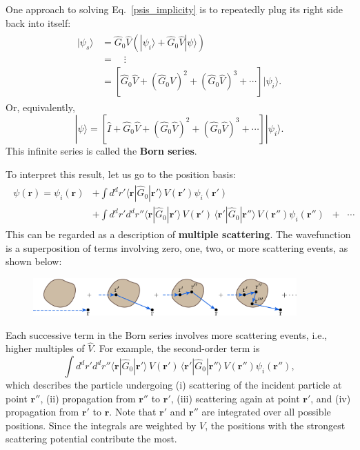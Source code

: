 \documentclass[pra,12pt]{revtex4-2}
\begin{document}
One approach to solving Eq.~\eqref{psis_implicity} is to repeatedly
plug its right side back into itself:
\begin{align}
  \begin{aligned}
    |\psi_s\rangle &= \hat{G}_0 \hat{V} \left(|\psi_i\rangle + \hat{G}_0 \hat{V}|\psi\rangle\right) \\
    &= \quad \vdots \\
    &= \left[\hat{G}_0 \hat{V} + (\hat{G}_0 \hat{V})^2 + (\hat{G}_0 \hat{V})^3 + \cdots\right]|\psi_i\rangle.
  \end{aligned}
\end{align}
Or, equivalently,
\begin{equation}
  |\psi\rangle
  = \left[\hat{I} + \hat{G}_0 \hat{V} + (\hat{G}_0 \hat{V})^2 + (\hat{G}_0 \hat{V})^3 + \cdots\right]|\psi_i\rangle.
  \label{bornseries}
\end{equation}
This infinite series is called the \textbf{Born series}.

To interpret this result, let us go to the position basis:
\begin{align}
  \begin{aligned}\psi(\mathbf{r}) = \psi_i(\mathbf{r}) &+ \int d^dr' \langle \mathbf{r} | \hat{G}_0 |\mathbf{r}'\rangle\, V(\mathbf{r}') \psi_i(\mathbf{r}') \\ &+ \int d^dr' d^dr'' \langle \mathbf{r} | \hat{G}_0 |\mathbf{r}'\rangle\, V(\mathbf{r}') \, \langle \mathbf{r}' | \hat{G}_0 |\mathbf{r}''\rangle \, V(\mathbf{r}'') \psi_i(\mathbf{r}'') \;\; + \;\;\cdots\end{aligned}
    \label{Bornposition}
\end{align}
This can be regarded as a description of \textbf{multiple scattering}.
The wavefunction is a superposition of terms involving zero, one, two,
or more scattering events, as shown below:

\begin{figure}[h!]
  \centering\includegraphics[width=0.9\textwidth]{bornseries}
\end{figure}

\noindent
Each successive term in the Born series involves more scattering
events, i.e., higher multiples of $\hat{V}$.  For example, the
second-order term is
\begin{equation*}
  \int d^dr' d^dr'' \langle \mathbf{r} | \hat{G}_0 |\mathbf{r}'\rangle\, V(\mathbf{r}') \, \langle \mathbf{r}' | \hat{G}_0 |\mathbf{r}''\rangle \, V(\mathbf{r}'') \psi_i(\mathbf{r}''),
\end{equation*}
which describes the particle undergoing (i) scattering of the incident
particle at point $\mathbf{r}''$, (ii) propagation from $\mathbf{r}''$
to $\mathbf{r}'$, (iii) scattering again at point $\mathbf{r}'$, and
(iv) propagation from $\mathbf{r}'$ to $\mathbf{r}$.  Note that
$\mathbf{r}'$ and $\mathbf{r}''$ are integrated over all possible
positions.  Since the integrals are weighted by $V$, the positions
with the strongest scattering potential contribute the most.
\end{document}
